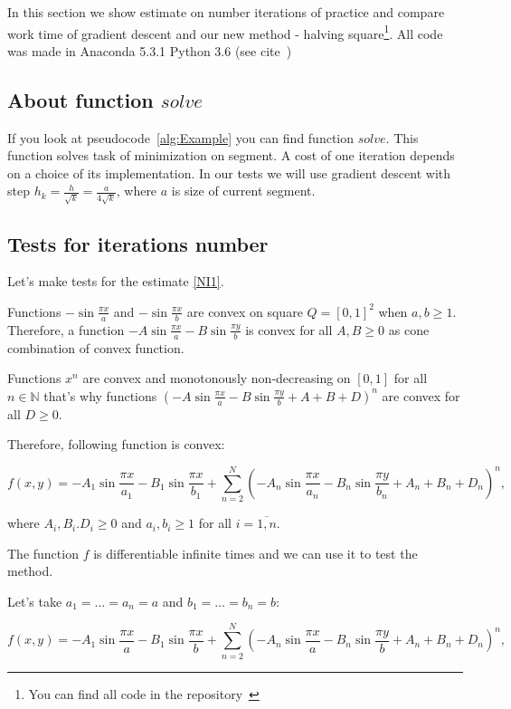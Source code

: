 \documentclass[12pt]{article}
\begin{document}
In this section we show estimate on number iterations of practice and compare work time of gradient descent and our new method - halving square\footnote{You can find all code in the repository~\cite{my_git}}. All code was made in Anaconda 5.3.1 Python 3.6 (see cite~\cite{conda})

\subsection{About function $solve$}

If you look at pseudocode~\ref{alg:Example} you can find function $solve$. This function solves task of minimization on segment. A cost of one iteration depends on a choice of its implementation. In our tests we will use gradient descent with step $h_k = \frac{h}{\sqrt{k}} = \frac{a}{4\sqrt{k}}$, where $a$ is size of current segment.

\subsection{Tests for iterations number}

Let's make tests for the estimate \eqref{NI1}.

Functions $-\sin\frac{\pi x}{a}$ and $-\sin\frac{\pi x}{b}$ are convex on square $Q = [0,1]^2$ when $a,b\geq 1$. Therefore, a function $-A\sin\frac{\pi x}{a} - B\sin\frac{\pi y}{b}$ is convex for all $A,B\geq 0$ as cone combination of convex function.

Functions $x^n$ are convex and monotonously non-decreasing on $[0, 1]$ for all $n \in \mathbb{N}$ that's why functions $\left(-A\sin\frac{\pi x}{a} - B\sin\frac{\pi y}{b} + A + B + D\right)^n$ are convex for all $D\geq 0$.

Therefore, following function is convex:

$$f(x,y) = -A_1\sin\frac{\pi x}{a_1} - B_1\sin\frac{\pi x}{b_1} + \sum\limits_{n=2}^N\left(-A_n\sin\frac{\pi x}{a_n} - B_n\sin\frac{\pi y}{b_n} + A_n + B_n + D_n\right)^n,$$

where $A_i, B_i. D_i\geq 0$ and $a_i, b_i \geq 1$ for all $i = \overline{1, n}$.

The function $f$ is differentiable infinite times and we can use it to test the method.

Let's take $a_1 = \dots = a_n = a$ and $b_1 = \dots = b_n = b$:

$$f(x,y) = -A_1\sin\frac{\pi x}{a} - B_1\sin\frac{\pi x}{b} + \sum\limits_{n=2}^N\left(-A_n\sin\frac{\pi x}{a} - B_n\sin\frac{\pi y}{b} + A_n + B_n + D_n\right)^n,$$
\end{document}
